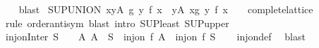 \begin{isabellebody}
%
\isadelimproof
\ \ %
\endisadelimproof
%
\isatagproof
{}\isamarkupfalse%
\ blast%
\endisatagproof
{\isafoldproof}%
%
\isadelimproof
\isanewline
%
\endisadelimproof
\isanewline
{}\isamarkupfalse%
\ SUP{\isacharunderscore}{\kern0pt}UNION{\isacharcolon}{\kern0pt}\ {\isachardoublequoteopen}{\isacharparenleft}{\kern0pt}{\isasymSqunion}x{\isasymin}{\isacharparenleft}{\kern0pt}{\isasymUnion}y{\isasymin}A{\isachardot}{\kern0pt}\ g\ y{\isacharparenright}{\kern0pt}{\isachardot}{\kern0pt}\ f\ x{\isacharparenright}{\kern0pt}\ {\isacharequal}{\kern0pt}\ {\isacharparenleft}{\kern0pt}{\isasymSqunion}y{\isasymin}A{\isachardot}{\kern0pt}\ {\isasymSqunion}x{\isasymin}g\ y{\isachardot}{\kern0pt}\ f\ x\ {\isacharcolon}{\kern0pt}{\isacharcolon}{\kern0pt}\ {\isacharunderscore}{\kern0pt}\ {\isacharcolon}{\kern0pt}{\isacharcolon}{\kern0pt}\ complete{\isacharunderscore}{\kern0pt}lattice{\isacharparenright}{\kern0pt}{\isachardoublequoteclose}\isanewline
%
\isadelimproof
\ \ %
\endisadelimproof
%
\isatagproof
{}\isamarkupfalse%
\ {\isacharparenleft}{\kern0pt}rule\ order{\isacharunderscore}{\kern0pt}antisym{\isacharparenright}{\kern0pt}\ {\isacharparenleft}{\kern0pt}blast\ intro{\isacharcolon}{\kern0pt}\ SUP{\isacharunderscore}{\kern0pt}least\ SUP{\isacharunderscore}{\kern0pt}upper{}{\isacharparenright}{\kern0pt}{\isacharplus}{\kern0pt}%
\endisatagproof
{\isafoldproof}%
%
\isadelimproof
%
\endisadelimproof
%
\isadelimdocument
%
\endisadelimdocument
%
\isatagdocument
%
\isamarkuptrue%
%
\endisatagdocument
{\isafolddocument}%
%
\isadelimdocument
%
\endisadelimdocument
{}\isamarkupfalse%
\ inj{\isacharunderscore}{\kern0pt}on{\isacharunderscore}{\kern0pt}Inter{\isacharcolon}{\kern0pt}\ {\isachardoublequoteopen}S\ {\isasymnoteq}\ {\isacharbraceleft}{\kern0pt}{\isacharbraceright}{\kern0pt}\ {\isasymLongrightarrow}\ {\isacharparenleft}{\kern0pt}{\isasymAnd}A{\isachardot}{\kern0pt}\ A\ {\isasymin}\ S\ {\isasymLongrightarrow}\ inj{\isacharunderscore}{\kern0pt}on\ f\ A{\isacharparenright}{\kern0pt}\ {\isasymLongrightarrow}\ inj{\isacharunderscore}{\kern0pt}on\ f\ {\isacharparenleft}{\kern0pt}{\isasymInter}S{\isacharparenright}{\kern0pt}{\isachardoublequoteclose}\isanewline
%
\isadelimproof
\ \ %
\endisadelimproof
%
\isatagproof
{}\isamarkupfalse%
\ inj{\isacharunderscore}{\kern0pt}on{\isacharunderscore}{\kern0pt}def\ \isamarkupfalse%
\ blast%
\endisatagproof
{\isafoldproof}%
%
\isadelimproof
\isanewline
%
\endisadelimproof
\isanewline
{}\isamarkupfalse%

\end{isabellebody}

